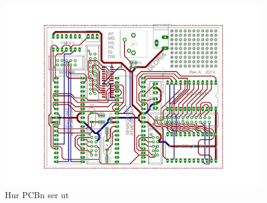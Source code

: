\begin{figure}[h!]
	\centering
	\includegraphics[scale=0.4]{grafik/kopplingsschema-pcb}
	\caption{Hur PCBn ser ut} \label{kopplingsschema-pcb}
\end{figure}
